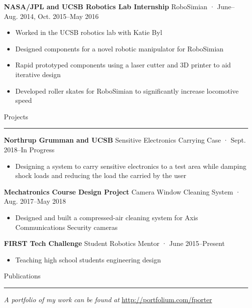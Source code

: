\documentclass[12pt, oneside]{article}
\newcommand{\headingstyleJobs}[1] {
	{\fontsize{19pt}{1em}\selectfont \textcolor{new_red}{\textsf{#1}}}
	\textcolor{new_red}{\rule{3.25in}{0.5pt}} \vspace{3pt}
}
\newcommand{\jobtitle}[3] {
	{\bf #1} {#2} · {#3} \vspace{-10pt} \\
}
\begin{document}
\begin{flushleft}
\jobtitle{NASA/JPL and UCSB Robotics Lab Internship}{RoboSimian}{June–Aug. 2014, Oct. 2015–May 2016}
\begin{itemize}
	\item Worked in the UCSB robotics lab with Katie Byl
	\item Designed components for a novel robotic manipulator for RoboSimian
	\item Rapid prototyped components using a laser cutter and 3D printer to aid iterative design
	\item Developed roller skates for RoboSimian to significantly increase locomotive speed 
\end{itemize}


\headingstyleJobs{Projects}

\jobtitle{Northrup Grumman and UCSB}{Sensitive Electronics Carrying Case}{Sept. 2018–In Progress}
\begin{itemize}
	\item Designing a system to carry sensitive electronics to a test area while damping shock loads and reducing the load the carried by the user
\end{itemize}

\jobtitle{Mechatronics Course Design Project}{Camera Window Cleaning System}{Aug. 2017–May 2018}
\begin{itemize}
	\item Designed and built a compressed-air cleaning system for Axis Communications Security cameras 
\end{itemize}

\jobtitle{FIRST Tech Challenge}{Student Robotics Mentor}{June 2015–Present}
\begin{itemize}
	\item Teaching high school students engineering design
\end{itemize}




\headingstyleJobs{Publications}

\vspace{-9pt}
\nocite{OWMS-DSA}




\textit{A portfolio of my work can be found at} \url{http://portfolium.com/fporter}

\end{flushleft}
\end{document}
